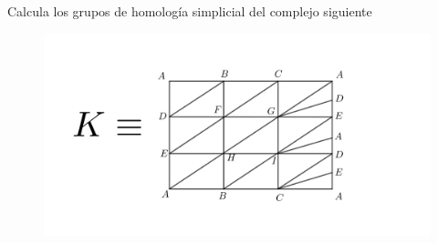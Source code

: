 \documentclass[twoside]{article}
\begin{document}
\begin{ejercicio}{2}
Calcula los grupos de homología simplicial del complejo siguiente
\begin{figure}[h!]
\includegraphics[scale=0.9]{K}
\end{figure}
\end{ejercicio}
\end{document}
